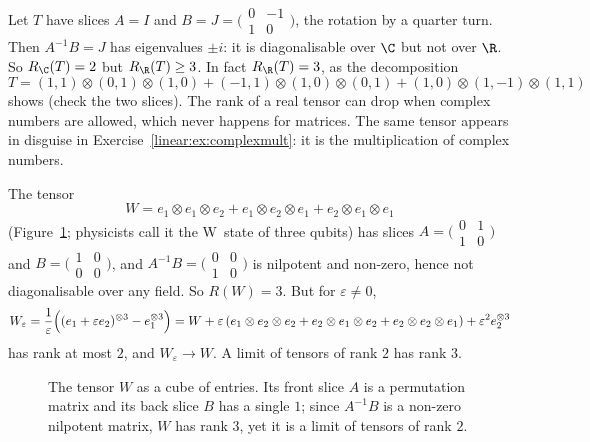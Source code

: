 \begin{example}\label{linear:exa:rotation}
Let $T$ have slices $A=I$ and $B=J=\bigl(\begin{smallmatrix}0&-1\\1&0\end{smallmatrix}\bigr)$, the rotation by a quarter turn. Then
$A^{-1}B=J$ has eigenvalues $\pm i$: it is diagonalisable over $\C$ but not over $\R$. So $R_\C(T)=2$ but $R_\R(T)\ge3$. In fact
$R_\R(T)=3$, as the decomposition
\[
T=(1,1)\otimes(0,1)\otimes(1,0)+(-1,1)\otimes(1,0)\otimes(0,1)+(1,0)\otimes(1,-1)\otimes(1,1)
\]
shows (check the two slices). The rank of a real tensor can drop when complex numbers are allowed, which never happens for
matrices. The same tensor appears in disguise in Exercise~\ref{linear:ex:complexmult}: it is the multiplication of complex numbers.
\end{example}

\begin{example}\label{linear:exa:wtensor}
The tensor
\[
W=e_1\otimes e_1\otimes e_2+e_1\otimes e_2\otimes e_1+e_2\otimes e_1\otimes e_1
\]
(Figure~\ref{linear:fig:wtensor}; physicists call it the W~state of three qubits) has slices $A=\bigl(\begin{smallmatrix}0&1\\1&0
\end{smallmatrix}\bigr)$ and $B=\bigl(\begin{smallmatrix}1&0\\0&0\end{smallmatrix}\bigr)$, and $A^{-1}B=\bigl(\begin{smallmatrix}0&0\\1&0
\end{smallmatrix}\bigr)$ is nilpotent and non-zero, hence not diagonalisable over any field. So $R(W)=3$. But for $\varepsilon\ne0$,
\[
W_\varepsilon=\frac1\varepsilon\Bigl((e_1+\varepsilon e_2)^{\otimes3}-e_1^{\otimes3}\Bigr)=W+\varepsilon\,(e_1\otimes e_2\otimes e_2+
e_2\otimes e_1\otimes e_2+e_2\otimes e_2\otimes e_1)+\varepsilon^2e_2^{\otimes3}
\]
has rank at most $2$, and $W_\varepsilon\to W$. A limit of tensors of rank $2$ has rank $3$.
\end{example}

\begin{figure}[ht]
\centering
{}
\caption{The tensor $W$ as a cube of entries. Its front slice $A$ is a permutation matrix and its back slice $B$ has a single
$1$; since $A^{-1}B$ is a non-zero nilpotent matrix, $W$ has rank $3$, yet it is a limit of tensors of rank $2$.}
\label{linear:fig:wtensor}
\end{figure}


